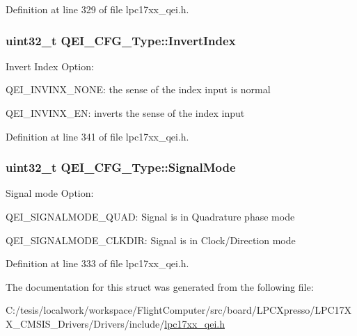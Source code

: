\-Definition at line 329 of file lpc17xx\-\_\-qei.\-h.

\hypertarget{struct_q_e_i___c_f_g___type_a91729828dfd03d8688b4b5f561bff9cb}{
\subsubsection[{\-Invert\-Index}]{\setlength{\rightskip}{0pt plus 5cm}uint32\-\_\-t {\bf \-Q\-E\-I\-\_\-\-C\-F\-G\-\_\-\-Type\-::\-Invert\-Index}}}\label{struct_q_e_i___c_f_g___type_a91729828dfd03d8688b4b5f561bff9cb}
\-Invert \-Index \-Option\-:
\begin{DoxyItemize}
\item \-Q\-E\-I\-\_\-\-I\-N\-V\-I\-N\-X\-\_\-\-N\-O\-N\-E\-: the sense of the index input is normal
\item \-Q\-E\-I\-\_\-\-I\-N\-V\-I\-N\-X\-\_\-\-E\-N\-: inverts the sense of the index input 
\end{DoxyItemize}

\-Definition at line 341 of file lpc17xx\-\_\-qei.\-h.

\hypertarget{struct_q_e_i___c_f_g___type_a20b0f08f6a6549d99398ce3b654a022a}{
\subsubsection[{\-Signal\-Mode}]{\setlength{\rightskip}{0pt plus 5cm}uint32\-\_\-t {\bf \-Q\-E\-I\-\_\-\-C\-F\-G\-\_\-\-Type\-::\-Signal\-Mode}}}\label{struct_q_e_i___c_f_g___type_a20b0f08f6a6549d99398ce3b654a022a}
\-Signal mode \-Option\-:
\begin{DoxyItemize}
\item \-Q\-E\-I\-\_\-\-S\-I\-G\-N\-A\-L\-M\-O\-D\-E\-\_\-\-Q\-U\-A\-D\-: \-Signal is in \-Quadrature phase mode
\item \-Q\-E\-I\-\_\-\-S\-I\-G\-N\-A\-L\-M\-O\-D\-E\-\_\-\-C\-L\-K\-D\-I\-R\-: \-Signal is in \-Clock/\-Direction mode 
\end{DoxyItemize}

\-Definition at line 333 of file lpc17xx\-\_\-qei.\-h.



\-The documentation for this struct was generated from the following file\-:\begin{DoxyCompactItemize}
\item 
\-C\-:/tesis/localwork/workspace/\-Flight\-Computer/src/board/\-L\-P\-C\-Xpresso/\-L\-P\-C17\-X\-X\-\_\-\-C\-M\-S\-I\-S\-\_\-\-Drivers/\-Drivers/include/\hyperlink{lpc17xx__qei_8h}{lpc17xx\-\_\-qei.\-h}\end{DoxyCompactItemize}
